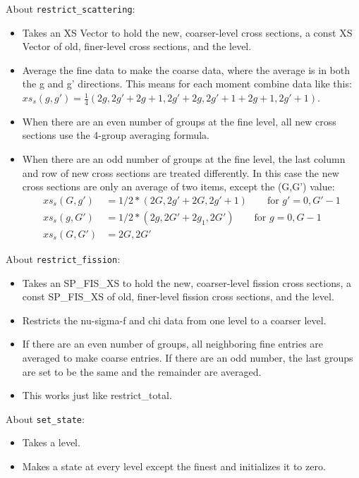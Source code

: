 \documentclass[12pt, letterpaper]{article}
\begin{document}
\noindent About \verb+restrict_scattering+:
\begin{itemize}
  \item Takes an XS Vector to hold the new, coarser-level cross sections, a const XS Vector of old, finer-level cross sections, and the level.
  \item Average the fine data to make the coarse data, where the average is in both the g and g' directions. This means for each moment combine data like this: \\ 
  $xs_s(g,g') = \frac{1}{4}(2g,2g' + 2g+1,2g' + 2g,2g'+1 + 2g+1,2g'+1)$. 
   \item When there are an even number of groups at the fine level, all new cross sections use the 4-group averaging formula.
  \item When there are an odd number of groups at the fine level, the last column and row of new cross sections are treated differently. In this case the new cross sections are only an average of two items, except the (G,G') value:
  \begin{align}
    xs_s(G,g') &= 1/2*(2G,2g' + 2G,2g'+1) \qquad \text{for } g' = 0, G'-1 \nonumber \\
    xs_s(g,G') &= 1/2*(2g,2G' + 2g_1,2G') \qquad \text{for } g  = 0, G-1 \nonumber \\
    xs_s(G,G') &= 2G,2G' \nonumber
  \end{align}
\end{itemize}  

\noindent About \verb+restrict_fission+:
\begin{itemize}  
  \item Takes an SP\_FIS\_XS to hold the new, coarser-level fission cross sections, a const SP\_FIS\_XS of old, finer-level fission cross sections, and the level.
  \item Restricts the nu-sigma-f and chi data from one level to a coarser level. 
  \item If there are an even number of groups, all neighboring fine entries are averaged to make coarse entries. If there are an odd number, the last groups are set to be the same and the remainder are averaged.
  \item This works just like restrict\_total.
\end{itemize}  

\noindent About \verb+set_state+:
\begin{itemize}
  \item Takes a level.
  \item Makes a state at every level except the finest and initializes it to zero. 
\end{itemize}
\end{document}
